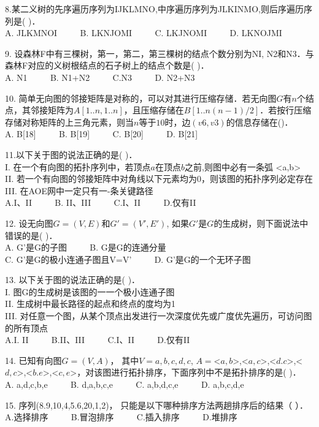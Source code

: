 8.某二义树的先序遍历序列为IJKLMNO,中序遍历序列为JLKINMO,则后序遍历序列是( )． \\
A. JLKMNOI $\qquad$ B. LKNJOMI $\qquad$ C. LKJNOMI $\qquad$ D. LKNOJMI

9. 设森林F中有三棵树，第一，第二，第三棵树的结点个数分别为NI, N2和N3．与森林F对应的义树根结点的石子树上的结点个数是(    )． \\
A. N1 $\qquad$ B. N1+N2 $\qquad$ C.N3 $\qquad$ D. N2+N3

10. 简单无向图的邻接矩阵是对称的，可以对其进行压缩存储．若无向图$G$有$n$个结点，其邻接矩阵为$A[1..n,1..n]$，且压缩存储在$B[1..n(n-1)/2]$．若按行压缩存储对称矩阵的上三角元素，则当$n$等于$10$时，边$(v6, v3)$的信息存储在()． \\
A. B[18] $\qquad$ B. B[19] $\qquad$ C. B[20] $\qquad$ D. B[21]

11.以下关于图的说法正确的是(    )． \\
I. 在一个有向图的拓扑序列中，若顶点$a$在顶点$b$之前,则图中必有一条弧 <a,b> \\
II. 若一个有向图的邻接矩阵中对角线以下元素均为0，则该图的拓扑序列必定存在 \\
III. 在AOE网中一定只有一-条关键路径 \\
A.I、II $\qquad$ B. II、III $\qquad$ C.I、II $\qquad$ D.仅有II

12. 设无向图$G=(V, E)$和$G'=(V',E')$, 如果$G'$是$G$的生成树，则下面说法中错误的是(    )． \\
A. G'是G的子图 $\qquad$ B. G是G的连通分量 \\
C. G’是G的极小连通子图且V=V' $\qquad$ D. G'是G的一个无环子图

13. 以下关于图的说法正确的是(    )． \\
I. 图G的生成树是该图的一一个极小连通子图 \\
II. 生成树中最长路径的起点和终点的度均为1 \\
III. 对任意一个图，从某个顶点出发进行一次深度优先或广度优先遍历，可访问图的所有顶点 \\
A.I. II $\qquad$ B.II、III $\qquad$ C.I、II $\qquad$ D.仅有II

14. 已知有向图$G=(V,A)$， 其中$V=${$a,b,c,d,c$}, $A=${<$a,b$>,<$a,c$>,<$d.c$>,<$d,c$>,<$b.e$>,<$c,e$>}，对该图进行拓扑排序，下面序列中不是拓扑排序的是(    )． \\
A. a,d,c,b,e $\qquad$ B. d,a,b,c,e $\qquad$ C. a,b,d,c,e $\qquad$ D. a,b,c,d,e

15. 序列(8.9,10,4,5.6,20,1,2)， 只能是以下哪种排序方法两趟排序后的结果（    ）． \\
A.选择排序 $\qquad$ B.冒泡排序 $\qquad$ C.插入排序 $\qquad$ D.堆排序


